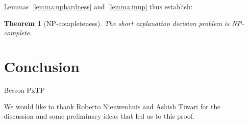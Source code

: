 \documentclass{easychair}
\newtheorem{theorem}{Theorem}
\begin{document}
Lemmas~\ref{lemma:nphardness} and~\ref{lemma:innp} thus establish:

\begin{theorem}[NP-completeness]
The short explanation decision problem is NP-complete.
\end{theorem}

\section*{Conclusion}

Besson PxTP

We would like to thank Roberto Nieuwenhuis and Ashish Tiwari for the discussion
and some preliminary ideas that led us to this proof.



\end{document}
